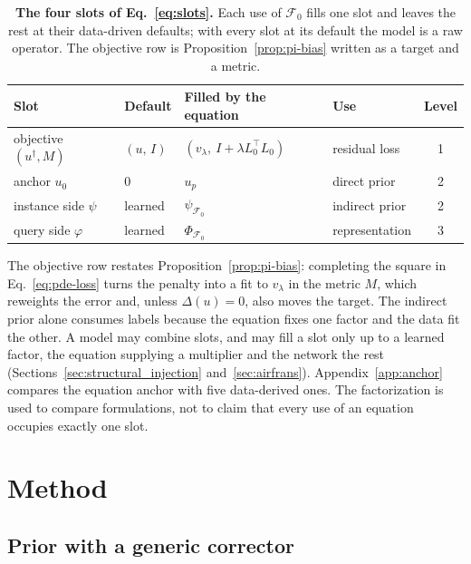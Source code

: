 \documentclass{article}
\begin{document}
\begin{table}[t]
    \centering
    \caption{\textbf{The four slots of Eq.~\ref{eq:slots}.} Each use of $\mathcal{F}_0$ fills one
    slot and leaves the rest at their data-driven defaults; with every slot at its default the model
    is a raw operator. The objective row is Proposition~\ref{prop:pi-bias} written as a target and a
    metric.}
    \label{tab:slots}
    \scriptsize
    \setlength{\tabcolsep}{20pt}
    \renewcommand{\arraystretch}{1}
    \begin{tabular}{llllc}
        \toprule
        Slot & Default & Filled by the equation & Use & Level \\
        \midrule
        objective $(u^\dagger,M)$ & $(u,\,I)$ & $(v_\lambda,\ I+\lambda L_0^{\!\top}L_0)$ & residual loss & 1 \\
        anchor $u_0$ & $0$ & $u_p$ & direct prior & 2 \\
        instance side $\psi$ & learned & $\psi_{\mathcal{F}_0}$ & indirect prior & 2 \\
        query side $\varphi$ & learned & $\Phi_{\mathcal{F}_0}$ & representation & 3 \\
        \bottomrule
    \end{tabular}
    \vspace{-5mm}
\end{table}

The objective row restates Proposition~\ref{prop:pi-bias}: completing the square in Eq.~\ref{eq:pde-loss} turns the penalty into a fit to $v_\lambda$ in the metric $M$, which reweights the error and, unless $\Delta(u)=0$, also moves the target. The indirect prior alone consumes labels because the equation fixes one factor and the data fit the other. A model may combine slots, and may fill a slot only up to a learned factor, the equation supplying a multiplier and the network the rest (Sections~\ref{sec:structural_injection} and~\ref{sec:airfrans}). Appendix~\ref{app:anchor} compares the equation anchor with five data-derived ones. The factorization is used to compare formulations, not to claim that every use of an equation occupies exactly one slot.

\section{Method}
\label{sec:method}
\vspace{-3mm}
\subsection{Prior with a generic corrector}
\label{sec:generic_corrector}
\end{document}
